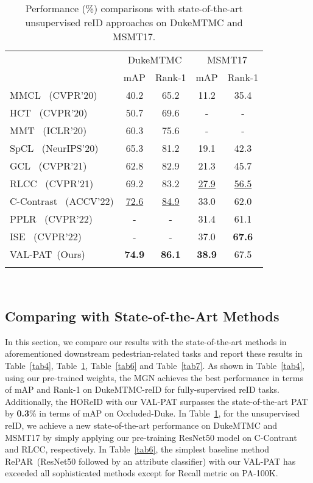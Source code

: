 \documentclass[final]{cvpr}
\begin{document}
\begin{table}
\small
\centering
\setlength{\tabcolsep}{1.4mm}
\begin{tabular}{l|cc|cc}
\shline
    \multirow{2}{*}{Methods} & \multicolumn{2}{c|}{DukeMTMC} & \multicolumn{2}{c}{MSMT17} \\
    \cline{2-5} & mAP & Rank-1 & mAP & Rank-1 \\ 
    \hline
MMCL~\cite{wang2020unsupervised} (CVPR'20) & 40.2 & 65.2 & 11.2 & 35.4 \\
    HCT~\cite{zeng2020hierarchical} (CVPR'20) & 50.7 & 69.6 & - & - \\
    MMT~\cite{dubourvieux2021unsupervised} (ICLR'20) & 60.3 & 75.6 & - & - \\
    SpCL~\cite{ge2020self} (NeurIPS'20) & 65.3 & 81.2 & 19.1 & 42.3 \\
    GCL~\cite{chen2021joint} (CVPR'21) & 62.8 & 82.9 & 21.3 & 45.7 \\
    RLCC~\cite{zhang2021refining} (CVPR'21) & 69.2 & 83.2 & \underline{27.9} & \underline{56.5} \\
    C-Contrast~\cite{dai2022cluster} (ACCV'22) & \underline{72.6} & \underline{84.9} & 33.0 & 62.0 \\
    PPLR~\cite{cho2022part} (CVPR'22) & - & - & 31.4 & 61.1 \\
    ISE~\cite{zhang2022implicit} (CVPR'22) & - & - & 37.0 & \textbf{67.6} \\
\hline
VAL-PAT~(Ours) & \textbf{74.9} & \textbf{86.1} & \textbf{38.9} & 67.5 \\
    \shline
\end{tabular}\\
\vspace{-1mm}
\caption{Performance (\%) comparisons with state-of-the-art unsupervised reID approaches on DukeMTMC and MSMT17. }
\label{tab5}
\vspace{-6mm}
\end{table}

\subsection{Comparing with State-of-the-Art Methods}
In this section, we compare our results with the state-of-the-art methods in aforementioned downstream pedestrian-related tasks and report these results in Table~\ref{tab4}, Table~\ref{tab5}, Table~\ref{tab6} and Table~\ref{tab7}.
As shown in Table~\ref{tab4}, using our pre-trained weights, the MGN achieves the best performance in terms of mAP and Rank-1 on DukeMTMC-reID for fully-supervised reID tasks.
Additionally, the HOReID with our VAL-PAT surpasses the state-of-the-art PAT by \textbf{0.3}\% in terms of mAP on Occluded-Duke.
In Table~\ref{tab5}, for the unsupervised reID, we achieve a new state-of-the-art performance on DukeMTMC and MSMT17 by simply applying our pre-training ResNet50 model on C-Contrant and RLCC, respectively.
In Table~\ref{tab6}, the simplest baseline method RePAR~(ResNet50 followed by an attribute classifier) with our VAL-PAT has exceeded all sophisticated methods except for Recall metric on PA-100K. 
\end{document}
